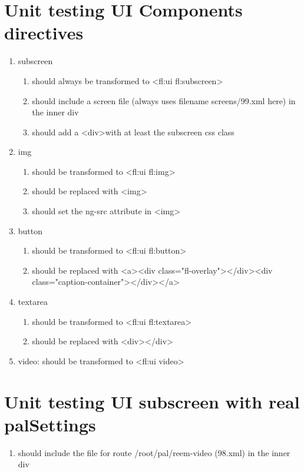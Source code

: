 \begin{singlespace}
\section{Unit testing UI Components directives}
\begin{enumerate}
\item     subscreen
\begin{enumerate}
\item         should always be transformed to \textless fl:ui fl:subscreen\textgreater
\item         should include a screen file (always uses filename screens/99.xml here) in the inner div
\item         should add a <div\textgreater with at least the subscreen css class
\end{enumerate}
\item     img
\begin{enumerate}
\item         should be transformed to \textless fl:ui fl:img\textgreater
\item         should be replaced with \textless img\textgreater
\item         should set the ng-src attribute in \textless img\textgreater
\end{enumerate}
\item     button
\begin{enumerate}
\item         should be transformed to \textless fl:ui fl:button\textgreater
\item         should be replaced with \textless a\textgreater\textless div class="fl-overlay"\textgreater\textless /div\textgreater\textless div class="caption-container"\textgreater\textless /div\textgreater\textless /a\textgreater
\end{enumerate}
\item     textarea
\begin{enumerate}
\item         should be transformed to \textless fl:ui fl:textarea\textgreater
\item         should be replaced with \textless div\textgreater\textless /div\textgreater
\end{enumerate}
\item     video: should be transformed to \textless fl:ui video\textgreater
\end{enumerate}

\section{Unit testing UI subscreen with real palSettings}
\begin{enumerate}
\item     should include the file for route /root/pal/reem-video (98.xml) in the inner div
\end{enumerate}


\end{singlespace}
